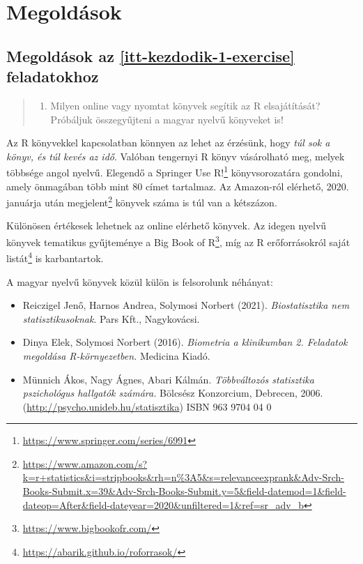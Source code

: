 \documentclass[
]{book}
\DeclareRobustCommand{\href}[2]{#2\footnote{\url{#1}}}
\providecommand{\tightlist}{%
  \setlength{\itemsep}{0pt}\setlength{\parskip}{0pt}}
\begin{document}
\hypertarget{appendix-fuxfcggeluxe9k}{%
\appendix}


\hypertarget{megoldasok}{%
\chapter{Megoldások}\label{megoldasok}}

\hypertarget{itt-kezdodik-1-exercise-solution}{%
\section{Megoldások az \ref{itt-kezdodik-1-exercise} feladatokhoz}\label{itt-kezdodik-1-exercise-solution}}

\begin{quote}
\begin{enumerate}
\def\labelenumi{\arabic{enumi}.}
\tightlist
\item
  Milyen online vagy nyomtat könyvek segítik az R elsajátítását? Próbáljuk összegyűjteni a magyar nyelvű könyveket is!
\end{enumerate}
\end{quote}

Az R könyvekkel kapcsolatban könnyen az lehet az érzésünk, hogy \emph{túl sok a könyv, és túl kevés az idő}. Valóban tengernyi R könyv vásárolható meg, melyek többsége angol nyelvű. Elegendő a Springer \href{https://www.springer.com/series/6991}{Use R!} könyvsorozatára gondolni, amely önmagában több mint 80 címet tartalmaz. Az Amazon-ról elérhető, 2020. januárja után \href{https://www.amazon.com/s?k=r+statistics\&i=stripbooks\&rh=n\%3A5\&s=relevanceexprank\&Adv-Srch-Books-Submit.x=39\&Adv-Srch-Books-Submit.y=5\&field-datemod=1\&field-dateop=After\&field-dateyear=2020\&unfiltered=1\&ref=sr_adv_b}{megjelent} könyvek száma is túl van a kétszázon.

Különösen értékesek lehetnek az online elérhető könyvek. Az idegen nyelvű könyvek tematikus gyűjteménye a \href{https://www.bigbookofr.com/}{Big Book of R}, míg az R erőforrásokról \href{https://abarik.github.io/roforrasok/}{saját listát} is karbantartok.

A magyar nyelvű könyvek közül külön is felsorolunk néhányat:

\begin{itemize}
\tightlist
\item
  Reiczigel Jenő, Harnos Andrea, Solymosi Norbert (2021). \emph{Biostatisztika nem statisztikusoknak}. Pars Kft., Nagykovácsi.
\item
  Dinya Elek, Solymosi Norbert (2016). \emph{Biometria a klinikumban 2. Feladatok megoldása R-környezetben.} Medicina Kiadó.
\item
  Münnich Ákos, Nagy Ágnes, Abari Kálmán. \emph{Többváltozós statisztika pszichológus hallgatók számára.} Bölcsész Konzorcium, Debrecen, 2006. (\url{http://psycho.unideb.hu/statisztika})
  ISBN 963 9704 04 0
\end{itemize}
\end{document}
